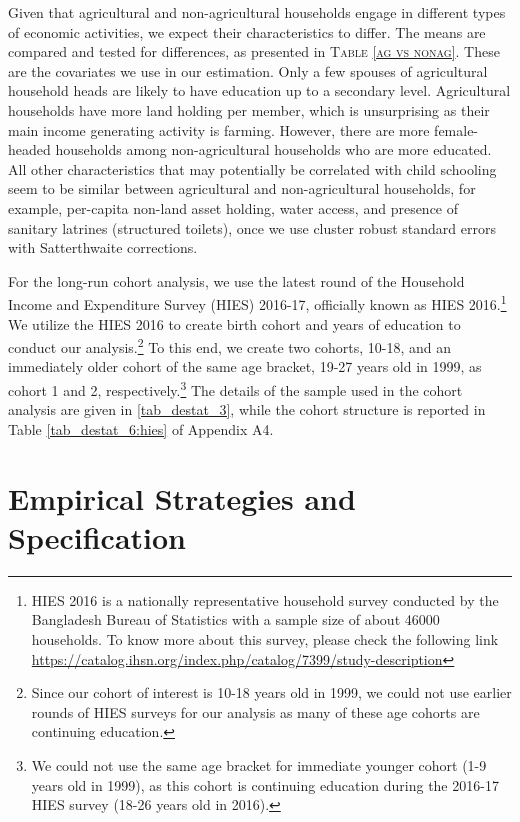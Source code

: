 \documentclass[12pt,letterpaper]{article}
\newcommand{\0}{\ensuremath{\mbox{\boldmath $0$}}}
\begin{document}
Given that agricultural and non-agricultural households engage in different types of economic activities, we expect their characteristics to differ. The means are compared and tested for differences, as presented in \textsc{\small Table \ref{ag vs nonag}}. These are the covariates we use in our estimation. Only a few spouses of agricultural household heads are likely to have education up to a secondary level. Agricultural households have more land holding per member, which is unsurprising as their main income generating activity is farming. However, there are more female-headed households among non-agricultural households who are more educated. All other characteristics that may potentially be correlated with child schooling seem to be similar between agricultural and non-agricultural households, for example, per-capita non-land asset holding, water access, and presence of sanitary latrines (structured toilets), once we use cluster robust standard errors with Satterthwaite corrections.%

For the long-run cohort analysis, we use the latest round of the Household Income and Expenditure Survey (HIES) 2016-17, officially known as HIES 2016.\footnote{HIES 2016 is a nationally representative household survey conducted by the Bangladesh Bureau of Statistics with a sample size of about 46000 households. To know more about this survey, please check the following link \url{https://catalog.ihsn.org/index.php/catalog/7399/study-description}} We utilize the HIES 2016 to create birth cohort and years of education to conduct our analysis.\footnote{Since our cohort of interest is 10-18 years old in 1999, we could not use earlier rounds of HIES surveys for our analysis as many of these age cohorts are continuing education.} To this end, we create two cohorts, 10-18, and an immediately older cohort of the same age bracket, 19-27 years old in 1999, as cohort 1 and 2, respectively.\footnote{We could not use the same age bracket for immediate younger cohort (1-9 years old in 1999), as this cohort is continuing education during the 2016-17 HIES survey (18-26 years old in 2016).} The details of the sample used in the cohort analysis are given in \ref{tab_destat_3}, while the cohort structure is reported in Table \ref{tab_destat_6:hies} of Appendix A4.  



\section{Empirical Strategies and Specification}\label{sec_empirical}
\end{document}
